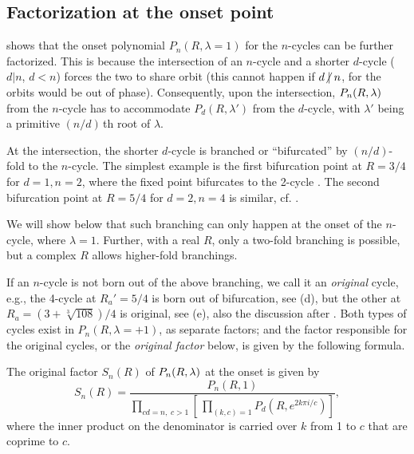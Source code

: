 \documentclass[twocolumn]{revtex4-1}
\begin{document}
\subsection{\label{sec:origfac}Factorization at the onset point}


 shows that
the onset polynomial
  $P_n(R, \lambda = 1)$ for the $n$-cycles
  can be further factorized.
%
This is because the intersection of an $n$-cycle
  and a shorter $d$-cycle ($d|n$, $d < n$)
  forces the two to share orbit
  (this cannot happen if $d \centernot| n$,
  for the orbits would be out of phase).
%
Consequently, upon the intersection,
  $P_n(R, \lambda)$ from the $n$-cycle
  has to accommodate $P_d(R, \lambda')$ from the $d$-cycle,
  with $\lambda'$ being a primitive $(n/d)\,$th root of $\lambda$.

At the intersection,
  the shorter $d$-cycle is branched or ``bifurcated''
  by $(n/d)$-fold to the $n$-cycle.
%
The simplest example is the first bifurcation point
  at $R = 3/4$ for $d = 1, n = 2$,
  where the fixed point 
  bifurcates to
  the 2-cycle .
The second bifurcation point at $R=5/4$ for $d = 2, n = 4$ is similar,
  cf. .


We will show below that such branching can only happen
  at the onset of the $n$-cycle, where $\lambda = 1$.
%
Further, with a real $R$, only a two-fold branching is possible,
  but a complex $R$ allows higher-fold branchings.



If an $n$-cycle is not born out of the above branching,
  we call it an \emph{original} cycle,
  e.g., the 4-cycle at $R_a' = 5/4$
  is born out of bifurcation, see (d),
  but the other at $R_a = (3+\sqrt[3]{108})/4$
  is original, see (e),
  also the discussion after .
%
Both types of cycles exist in $P_n(R, \lambda = +1)$,
  as separate factors;
and the factor responsible for the original cycles,
  or the \emph{original factor} below,
  is given by the following formula.


\begin{theorem}
  The original factor $S_n(R)$ of $P_n(R, \lambda)$ at the onset is given by
  \begin{equation}
    S_n(R)
    = \frac
    {
      P_n(R, 1)
    }
    {
      \prod_{c d =  n, \; c > 1}
      \left[ \,
        \prod_{(k, c) = 1}
      P_{d}
        \left(
          R, e^{2k\pi i/c}
        \right)
      \right]
    },
  \label{eq:origfac}
  \end{equation}
  where the inner product on the denominator is carried over
   $k$ from 1 to $c$ that are coprime to $c$.
  \label{thm:origfac}
\end{theorem}
\end{document}
